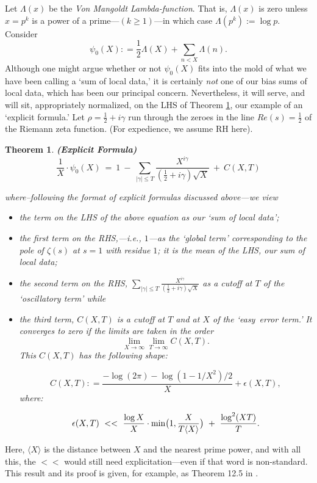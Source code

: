 \documentclass[11pt]{article}
\theoremstyle{plain}
\newtheorem{theorem}{Theorem}[section]
\theoremstyle{definition}
\numberwithin{equation}{section}
\numberwithin{figure}{section}
\numberwithin{table}{section}
\def\l{{\Lambda}}
\begin{document}
Let $\l(x)$ be the {\it Von Mangoldt Lambda-function}. That is, $\l(x)$ is zero unless $x= p^k$ is a power of a prime---$(k \ge 1)$---in which case $\l(p^k) := \log p$. Consider  $$\psi_0(X): = {\frac{1}{2}}\l(X) + \sum_{n < X}\l(n).$$ Although one might argue whether or not  $\psi_0(X)$ fits into the mold of what we have been calling a `sum of local data,' it is certainly {\it not} one of our bias sums of local data, which has been our principal concern. Nevertheless, it will serve,   and will sit, appropriately normalized,  on the LHS of Theorem \ref{ef}, our example of an `explicit formula.'
Let $\rho= {\frac{1}{2}}+i\gamma$ run through the zeroes in the line $Re(s)= {\frac{1}{2}}$ of the Riemann zeta function. (For expedience, we assume RH here).

\begin{theorem}\label{ef}{\bf (Explicit Formula)} $${\frac{1}{X}}\cdot \psi_0(X) \ = \ 1 \ - \ \sum_{|\gamma| \le T}{\frac{X^{i\gamma}}{({\frac{1}{2}}+i\gamma){\sqrt X}}} \ + \ C(X,T)$$

where--following the format of explicit formulas discussed above---we view \begin{itemize} \item  the term on the LHS of the above equation as our `sum of local data'; \item  the first term on the {\rm RHS},---i.e.,  $1$---as the `{\it global term}' corresponding to the pole of $\zeta(s)$ at $s=1$ with residue $1$; it is the {\it mean} of the {\rm LHS}, our sum of local data; \item  the second term on the {\rm RHS}, $\sum_{|\gamma| \le T}{\frac{X^{i\gamma}}{({\frac{1}{2}}+i\gamma){\sqrt X}}}$ as  a cutoff at $T$ of  the `{\it oscillatory term}' while \item  the third term, $C(X,T)$ is a cutoff at $T$ and at $X$ of the `{\it easy\ error term}.'  It converges to zero if the limits are taken in the order $$\lim_{X\to \infty}\lim_{T\to \infty}C(X,T).$$ This $C(X,T)$ has the following shape:

$$C(X,T): = {\frac{-\log(2\pi)-\log(1-1/X^2)/2}{ X}} + \epsilon(X,T), $$ where:

$$\epsilon(X,T) \ <<\ {\frac{\log X}{X}}\cdot {\rm min}\big(1, {\frac{X}{T\langle X \rangle}}\big)\ + \ {\frac{\log^2(X T) }{T}}.$$\end{itemize}\end{theorem}

Here, $\langle X \rangle$ is the distance between $X$ and the nearest prime power, and with all this, the $<<$ would still need explicitation---even if that word is non-standard.  This result  and its proof is given, for example, as Theorem 12.5 in \cite{MV}.
\end{document}
